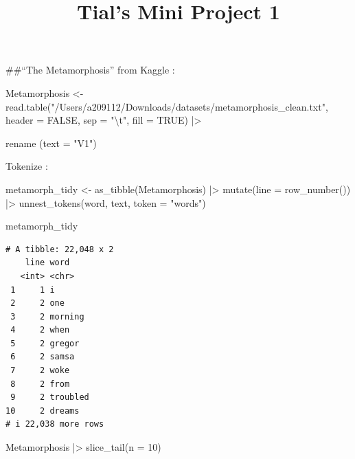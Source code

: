 \documentclass[
  letterpaper,
  DIV=11,
  numbers=noendperiod]{scrartcl}
\title{Tial's Mini Project 1}
\author{}
\date{}
\newenvironment{Shaded}{\begin{snugshade}}{\end{snugshade}}
\newcommand{\AttributeTok}[1]{\textcolor[rgb]{0.40,0.45,0.13}{#1}}
\newcommand{\ConstantTok}[1]{\textcolor[rgb]{0.56,0.35,0.01}{#1}}
\newcommand{\DecValTok}[1]{\textcolor[rgb]{0.68,0.00,0.00}{#1}}
\newcommand{\FunctionTok}[1]{\textcolor[rgb]{0.28,0.35,0.67}{#1}}
\newcommand{\NormalTok}[1]{\textcolor[rgb]{0.00,0.23,0.31}{#1}}
\newcommand{\OtherTok}[1]{\textcolor[rgb]{0.00,0.23,0.31}{#1}}
\newcommand{\SpecialCharTok}[1]{\textcolor[rgb]{0.37,0.37,0.37}{#1}}
\newcommand{\StringTok}[1]{\textcolor[rgb]{0.13,0.47,0.30}{#1}}
\begin{document}
\maketitle


\#\#``The Metamorphosis'' from Kaggle :

\begin{Shaded}
\begin{Highlighting}[]
\NormalTok{Metamorphosis }\OtherTok{\textless{}{-}} 
  \FunctionTok{read.table}\NormalTok{(}\StringTok{"/Users/a209112/Downloads/datasets/metamorphosis\_clean.txt"}\NormalTok{, }\AttributeTok{header =} \ConstantTok{FALSE}\NormalTok{, }\AttributeTok{sep =} \StringTok{"}\SpecialCharTok{\textbackslash{}t}\StringTok{"}\NormalTok{, }\AttributeTok{fill =} \ConstantTok{TRUE}\NormalTok{) }\SpecialCharTok{|\textgreater{}}

\FunctionTok{rename}\NormalTok{ (}\AttributeTok{text =} \StringTok{"V1"}\NormalTok{)  }
\end{Highlighting}
\end{Shaded}

Tokenize :

\begin{Shaded}
\begin{Highlighting}[]
\NormalTok{metamorph\_tidy }\OtherTok{\textless{}{-}} \FunctionTok{as\_tibble}\NormalTok{(Metamorphosis) }\SpecialCharTok{|\textgreater{}}
  \FunctionTok{mutate}\NormalTok{(}\AttributeTok{line =} \FunctionTok{row\_number}\NormalTok{()) }\SpecialCharTok{|\textgreater{}}
  \FunctionTok{unnest\_tokens}\NormalTok{(word, text, }\AttributeTok{token =} \StringTok{"words"}\NormalTok{)   }

\NormalTok{metamorph\_tidy   }
\end{Highlighting}
\end{Shaded}

\begin{verbatim}
# A tibble: 22,048 x 2
    line word    
   <int> <chr>   
 1     1 i       
 2     2 one     
 3     2 morning 
 4     2 when    
 5     2 gregor  
 6     2 samsa   
 7     2 woke    
 8     2 from    
 9     2 troubled
10     2 dreams  
# i 22,038 more rows
\end{verbatim}

\begin{Shaded}
\begin{Highlighting}[]
\NormalTok{Metamorphosis }\SpecialCharTok{|\textgreater{}} \FunctionTok{slice\_tail}\NormalTok{(}\AttributeTok{n =} \DecValTok{10}\NormalTok{)}
\end{Highlighting}
\end{Shaded}
\end{document}
